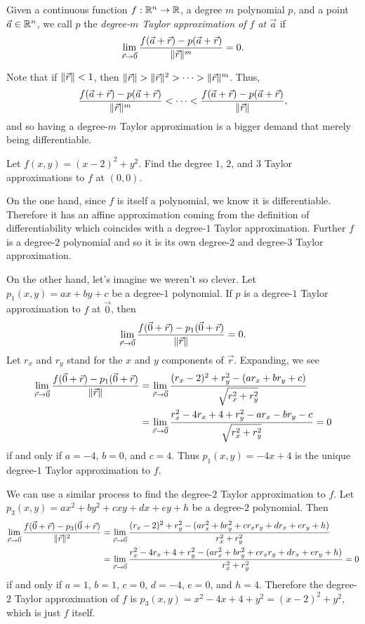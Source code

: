 \begin{definition}
	Given a continuous
	function $f:\mathbb{R}^n\to\mathbb{R}$, a degree $m$ polynomial $p$, and a point 
	$\vec a\in\mathbb{R}^n$, we
	call $p$ the \emph{degree-$m$ Taylor approximation of $f$ at $\vec a$} if
	\[
		\lim_{\vec r\to \vec 0} \frac{f(\vec a+\vec r)-p(\vec a+\vec r)}{\lVert\vec r\rVert^m}=0.
	\]
\end{definition}

Note that if $\lVert\vec r\rVert<1$, then $\lVert\vec r\rVert > \lVert\vec r\rVert^2> \cdots >\lVert\vec r\rVert^m$.
Thus, 
\[
	\frac{f(\vec a+\vec r)-p(\vec a+\vec r)}{\lVert\vec r\rVert^m}<\cdots<
\frac{f(\vec a+\vec r)-p(\vec a+\vec r)}{\lVert\vec r\rVert},
\]
and so having a degree-$m$ Taylor approximation is a bigger demand that merely being
differentiable.

\begin{example}
	Let $f(x,y)=(x-2)^2+y^2$.  Find the degree $1$, $2$, and $3$ Taylor
	approximations to $f$ at $(0,0)$.

	On the one hand, since $f$ is itself a polynomial, we know it is differentiable.  
	Therefore it has an affine approximation coming from the definition of differentiability
	which coincides with a degree-$1$ Taylor approximation.  Further $f$ is a degree-$2$
	polynomial and so it is its own degree-$2$ and degree-$3$ Taylor approximation.

	On the other hand, let's imagine we weren't so clever.  Let $p_1(x,y)=ax+by+c$
	be a degree-$1$ polynomial.  If $p$ is a degree-$1$ Taylor approximation to $f$
	at $\vec 0$, then
	\[
		\lim_{\vec r\to \vec 0} \frac{f(\vec 0+\vec r)-p_1(\vec 0+\vec r)}{\lVert\vec r\rVert}=0.
	\]
	Let $r_x$ and $r_y$ stand for the $x$ and $y$ components of $\vec r$.
	Expanding, we see
	\begin{align*}
		\lim_{\vec r\to \vec 0} \frac{f(\vec 0+\vec r)-p_1(\vec 0+\vec r)}{\lVert\vec r\rVert}&=
		\lim_{\vec r\to \vec 0} \frac{(r_x-2)^2+r_y^2 -(ar_x+br_y+c)}{\sqrt{r_x^2+r_y^2}}\\
		&=\lim_{\vec r\to \vec 0} \frac{r_x^2-4r_x+4+r_y^2 -ar_x-br_y-c}{\sqrt{r_x^2+r_y^2}}=0
	\end{align*}
	if and only if $a=-4$, $b=0$, and $c=4$.  Thus $p_1(x,y)=-4x+4$ is the unique degree-$1$
	Taylor approximation to $f$.

	We can use a similar process to find the degree-$2$ Taylor approximation to $f$.
	Let $p_3(x,y)=ax^2+by^2+cxy+dx+ey+h$ be a degree-$2$ polynomial.  Then
	\begin{align*}
		\lim_{\vec r\to \vec 0} \frac{f(\vec 0+\vec r)-p_3(\vec 0+\vec r)}{\lVert\vec r\rVert^2}&=
		\lim_{\vec r\to \vec 0} \frac{(r_x-2)^2+r_y^2 -(ar_x^2+br_y^2+cr_xr_y+dr_x+er_y+h)}{r_x^2+r_y^2}\\
		&=\lim_{\vec r\to \vec 0} \frac{r_x^2-4r_x+4+r_y^2 -(ar_x^2+br_y^2+cr_xr_y+dr_x+er_y+h)}{r_x^2+r_y^2}=0
	\end{align*}
	if and only if $a=1$, $b=1$, $c=0$, $d=-4$, $e=0$, and $h=4$.  Therefore
	the degree-$2$ Taylor approximation of $f$ is $p_3(x,y)=x^2-4x+4+y^2=(x-2)^2+y^2$, which
	is just $f$ itself.


\end{example}
